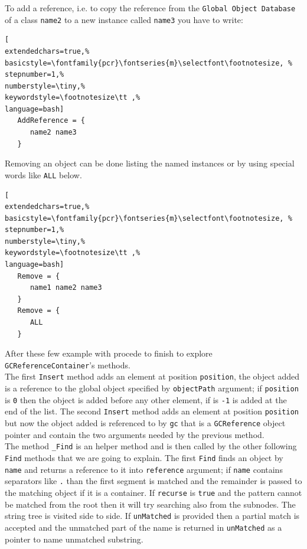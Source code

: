 To add a reference, i.e. to copy the reference from the \texttt{Global Object Database} of a class \texttt{name2} to a new instance called \texttt{name3} you have to write:

\begin{lstlisting}[
extendedchars=true,%
basicstyle=\fontfamily{pcr}\fontseries{m}\selectfont\footnotesize, %
stepnumber=1,%
numberstyle=\tiny,%
keywordstyle=\footnotesize\tt ,%
language=bash]
   AddReference = {
      name2 name3
   }
\end{lstlisting}

Removing an object can be done listing the named instances or by using special words like \texttt{ALL} below.

\begin{lstlisting}[
extendedchars=true,%
basicstyle=\fontfamily{pcr}\fontseries{m}\selectfont\footnotesize, %
stepnumber=1,%
numberstyle=\tiny,%
keywordstyle=\footnotesize\tt ,%
language=bash]
   Remove = {
      name1 name2 name3
   }
   Remove = {
      ALL
   }
\end{lstlisting}

After these few example with procede to finish to explore \texttt{GCReferenceContainer}'s methods. \\


The first \texttt{Insert} method adds an element at position \texttt{position}, the object added is a reference to the global object specified by \texttt{objectPath} argument; if \texttt{position} is \texttt{0} then the object is added before any other element, if is \texttt{-1} is added at the end of the list. The second \texttt{Insert} method adds an element at position \texttt{position} but now the object added is referenced to by \texttt{gc} that is a \texttt{GCReference} object pointer and contain the two arguments needed by the previous method.\\


The method \texttt{\_Find} is an helper method and is then called by the other following \texttt{Find} methods that we are going to explain. The first \texttt{Find} finds an object by \texttt{name} and returns a reference to it into \texttt{reference} argument; if \texttt{name} contains separators like \texttt{.} than the first segment is matched and the remainder is passed to the matching object if it is a container. If \texttt{recurse} is \texttt{true} and the pattern cannot be matched from the root then it will try searching also from the subnodes. The string tree is visited side to side. If \texttt{unMatched} is provided then a partial match is accepted and the unmatched part of the name is returned in \texttt{unMatched} as a pointer to name unmatched substring.

